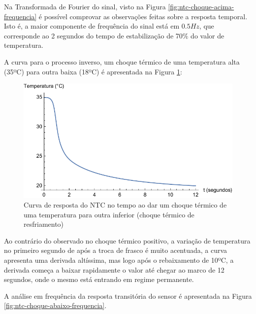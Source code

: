 \documentclass[a4paper]{instrumentacao}
\begin{document}
Na Transformada de Fourier do sinal, visto na Figura \ref{fig:ntc-choque-acima-frequencia} é possível comprovar as observações feitas sobre a resposta temporal. Isto é, a maior componente de frequência do sinal está em $0.5Hz$, que corresponde ao 2 segundos do tempo de estabilização de 70\% do valor de temperatura.

A curva para o processo inverso, um choque térmico de uma temperatura alta (35ºC) para outra baixa (18ºC) é apresentada na Figura \ref{fig:ntc-choque-abaixo-tempo}:

\begin{figure}[H]
\center
\includegraphics[width=\textwidth]{ThermalShock-Down-Time.pdf}
\caption{Curva de resposta do NTC no tempo ao dar um choque térmico de uma temperatura para outra inferior (choque térmico de resfriamento)}
\label{fig:ntc-choque-abaixo-tempo}
\end{figure}

Ao contrário do observado no choque térmico positivo, a variação de temperatura no primeiro segundo de após a troca de frasco é muito acentuada, a curva apresenta uma derivada altíssima, mas logo após o rebaixamento de 10ºC, a derivada começa a baixar rapidamente o valor até chegar ao marco de 12 segundos, onde o mesmo está entrando em regime permanente.

A análise em frequência da resposta transitória do sensor é apresentada na Figura \ref{fig:ntc-choque-abaixo-frequencia}.
\end{document}
